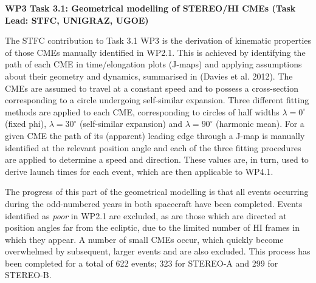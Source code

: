 \documentclass[11pt]{report}
\begin{document}
\newpage
\textbf{WP3 Task 3.1: Geometrical modelling of STEREO/HI CMEs (Task Lead: STFC, UNIGRAZ, UGOE)}
\begin{justify}
The STFC contribution to Task 3.1 WP3 is the derivation of kinematic properties of those 
CMEs manually identified in WP2.1. This is achieved by identifying the path of each 
CME in time/elongation plots (J-maps) and applying assumptions 
about their geometry and dynamics, summarised in (Davies et al. 2012). The CMEs are assumed to 
travel at a constant speed and to possess a cross-section corresponding to a circle undergoing 
self-similar expansion. Three different fitting methods are applied to each CME, corresponding 
to circles of half widths $\lambda=0^\circ$ (fixed phi), $\lambda=30^\circ$ (self-similar 
expansion) and $\lambda=90^\circ$ (harmonic mean). For a given CME the path of its (apparent) leading edge 
through a J-map is manually identified at the relevant position angle and each of the three fitting 
procedures are applied to determine a speed and direction. These values are, in turn, used to derive 
launch times for each event, which are then applicable to WP4.1.

The progress of this part of the geometrical modelling is that all events occurring during the 
odd-numbered years in both spacecraft have been completed. Events identified as \emph{poor} in WP2.1 
are excluded, as are those which are directed at position angles far from the ecliptic, due to 
the limited number of HI frames in which they appear. A number of small CMEs occur, which quickly become 
overwhelmed by subsequent, larger events and are also excluded. This process has been completed for 
a total of 622 events; 323 for STEREO-A and 299 for STEREO-B.


\end{justify}
\end{document}
